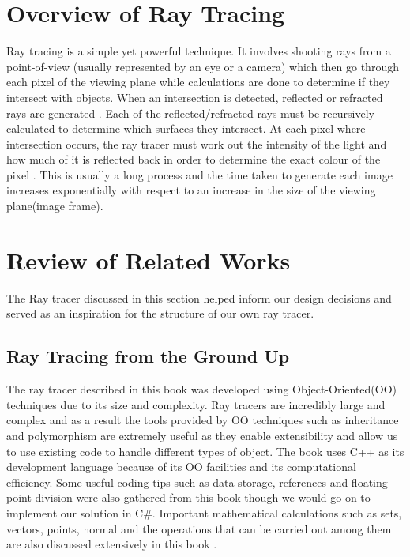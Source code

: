\documentclass[a4paper]{report}
\begin{document}
	
	\section{Overview of Ray Tracing}
	\par Ray tracing is a simple yet powerful technique. It involves shooting rays from a point-of-view (usually represented by an eye or a camera) which then go through each pixel of the viewing plane while calculations are done to determine if they intersect with objects. When an intersection is detected, reflected or refracted rays are generated \cite{weghorst_improved_1984}. Each of the reflected/refracted rays must be recursively calculated to determine which surfaces they intersect. At each pixel where intersection occurs, the ray tracer must work out the intensity of the light and how much of it is reflected back in order to determine the exact colour of the pixel \cite{suffern_ray_2007}. This is usually a long process and the time taken to generate each image increases exponentially with respect to an increase in the size of the viewing plane(image frame).\newline
	
	\section{Review of Related Works} \label{sec:review-of-tracers}
	\par The Ray tracer discussed in this section helped inform our design decisions and served as an inspiration for the structure of our own ray tracer.
	
	\subsection{Ray Tracing from the Ground Up}
	\par The ray tracer described in this book was developed using Object-Oriented(OO) techniques due to its size and complexity. Ray tracers are incredibly large and complex and as a result the tools provided by OO techniques such as inheritance and polymorphism are extremely useful as they enable extensibility and allow us to use existing code to handle different types of object. The book uses C++ as its development language because of its OO facilities and its computational efficiency. Some useful coding tips such as data storage, references and floating-point division were also gathered from this book though we would go on to implement our solution in C\#. Important mathematical calculations such as sets, vectors, points, normal and the operations that can be carried out among them are also discussed extensively in this book \cite{suffern_ray_2007}.
	\label{sssec:book}\newline
	
\end{document}
